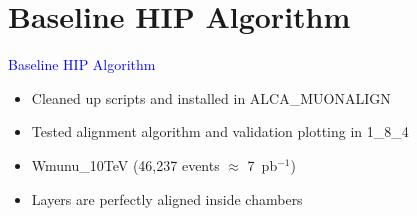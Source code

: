 \documentclass[compress]{beamer}
\begin{document}
\section*{Baseline HIP Algorithm}
\begin{frame}
\begin{center}
\Huge \textcolor{blue}{Baseline HIP Algorithm}
\end{center}

\vfill
\begin{itemize}
\item Cleaned up scripts and installed in ALCA\_MUONALIGN
\item Tested alignment algorithm and validation plotting in 1\_8\_4
\item Wmunu\_10TeV (46,237 events $\approx$ 7~pb$^{-1}$)
\item Layers are perfectly aligned inside chambers
\end{itemize}

\end{frame}
\end{document}
